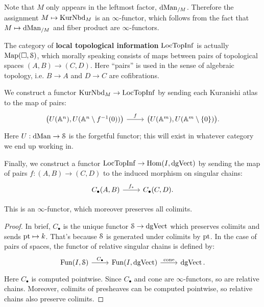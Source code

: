 
Note that $M$ only appears in the leftmost factor, $\operatorname{dMan}_{/M}$.
Therefore the assignment $M \mapsto \operatorname{KurNbd}_M$ is an $\infty$-functor,
which follows from the fact that $M \mapsto \operatorname{dMan}_{/M}$ and fiber product are $\infty$-functors.

\begin{defin}
The category of \textbf{local topological information} $\operatorname{LocTopInf}$ is actually $\operatorname{Map}(\Box, \mathcal S)$, which morally speaking
consists of maps between pairs of topological spaces $(A,B) \to (C,D)$. Here ``pairs'' is used in the sense of algebraic
topology, i.e. $B\to A$ and $D \to C$ are cofibrations.
\end{defin}

We construct a functor $\operatorname{KurNbd}_M \to \operatorname{LocTopInf}$ by sending each Kuranishi atlas to the map of pairs:
\[
\begin{tikzcd}
\big( U(\bbA^n), U(\bbA^n \setminus f^{-1}(0))\big)\arrow{r}{f} & \big( U(\bbA^m), U(\bbA^m \setminus \{0\})\big).
\end{tikzcd}
\]
Here $U: \operatorname{dMan} \to \mathcal S$ is the forgetful functor; this will exist in whatever category we end up working in.

Finally, we construct a functor $\operatorname{LocTopInf} \to \operatorname{Hom}(I, \operatorname{dgVect})$ by sending the map of pairs $f: (A,B) \to (C,D)$
to the induced morphism on singular chains:
\[
\begin{tikzcd}
C_{\bullet}(A,B) \arrow{r}{f_*} & C_{\bullet}(C,D) .
\end{tikzcd}
\]

\begin{lem}
This is an $\infty$-functor, which moreover preserves all colimits.
\end{lem}
\begin{proof}
In brief, $C_{\bullet}$ is the unique functor $\mathcal S \to \operatorname{dgVect}$ which preserves colimits and sends $\operatorname{pt} \mapsto k$. That's
because $\mathcal S$ is generated under colimits by $\operatorname{pt}$. In the case of pairs of spaces, the functor of relative singular
chains is defined by:
\[
\begin{tikzcd}
\Fun(I, \cS) \arrow{r}{C_{\bullet}} & \Fun(I, \dgVect) \arrow{r}{\text{cone}} & \dgVect .
\end{tikzcd}
\]
Here $C_{\bullet}$ is computed pointwise. Since $C_{\bullet}$ and $\text{cone}$ are $\infty$-functors, so are relative chains.
Moreover, colimits of presheaves can be computed pointwise, so relative chains also preserve colimits.
\end{proof}


